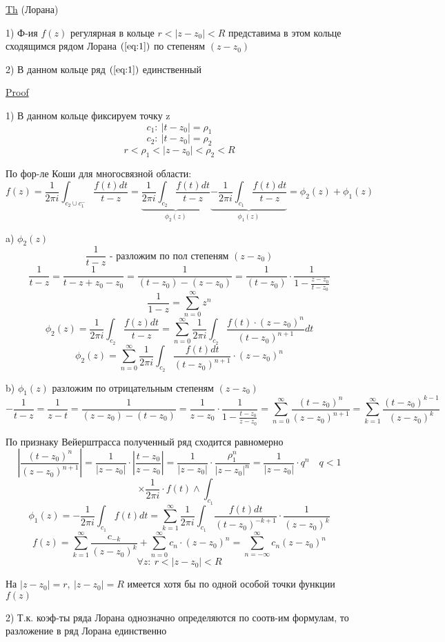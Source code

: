\documentclass[a4paper]{article}
\begin{document}
\begin{tcolorbox}
\underline{Th} (Лорана)

1) Ф-ия $ f(z) $ регулярная в кольце $ r < |z - z_0| < R $ представима в этом кольце
сходящимся рядом Лорана $ (\ref{eq:1}) $ по степеням $ (z - z_0) $ 

2) В данном кольце ряд $ (\ref{eq:1}) $ единственный

\underline{Proof}

1) В данном кольце фиксируем точку z
\[
    c_1: \ |t - z_0| = \rho_1
\]
\[
    c_2: \ |t - z_0| = \rho_2
\]
\[
    r < \rho_1 < |z - z_0| < \rho_2 < R
\]

По фор-ле Коши для многосвязной области:
\[
    f(z) = \frac{1}{2 \pi i} \int_{c_2 \cup c_1^{-}} \frac{f(t)dt}{t - z} = 
    \underbrace{\frac{1}{2 \pi i} \int_{c_2}\frac{f(t)dt}{t - z}}_{\phi_2(z)}
    \underbrace{- \frac{1}{2 \pi i} \int_{c_1}\frac{f(t)dt}{t - z}}_{\phi_1(z)}
    = \phi_2(z) + \phi_1(z)
\]

a) $ \phi_2(z) $ 
\[
    \frac{1}{t - z} \text{ - разложим по пол степеням }(z - z_0)
\]
\[
    \frac{1}{t - z} = \frac{1}{t - z + z_0 - z_0} = 
    \frac{1}{(t - z_0) - (z - z_0)} = \frac{1}{(t - z_0)} \cdot 
    \frac{1}{1 - \frac{z - z_0}{t - z_0}} 
\]
\[
    \frac{1}{1 - z} = \sum_{n=0}^{\infty} z^{n}
\]
\[
    \phi_2(z) = \frac{1}{2 \pi i} \int_{c_2} \frac{f(z)dt}{t - z} =
    \sum_{n=0}^{\infty} \frac{1}{2 \pi i} \int_{c_2}\frac{f(t)\cdot(z -z_0)^{n}}
    {(t-z_0)^{n+1}} dt
\]
\[
    \phi_2(z) = \sum_{n=0}^{\infty} \frac{1}{2 \pi i} \int_{c_2} \frac{f(t)dt}{(t - z_0)^{n+1}} 
    \cdot (z - z_0)^{n}
\]

b) $ \phi_1(z) $ разложим по отрицательным степеням $ (z - z_0) $ 
\[
    -\frac{1}{t-z} = \frac{1}{z-t} = \frac{1}{(z - z_0)-(t-z_0)} =
    \frac{1}{z - z_0} \cdot \frac{1}{1 - \frac{t-z_0}{z-z_0}} =
    \sum_{n=0}^{\infty} \frac{(t-z_0)^{n}}{(z-z_0)^{n+1}} = 
    \sum_{k=1}^{\infty} \frac{(t-z_0)^{k-1}}{(z-z_0)^{k}} 
\]

По признаку Вейерштрасса полученный ряд сходится равномерно
\[
    \left| \frac{(t-z_0)^{n}}{(z-z_0)^{n+1}} \right|  =\frac{1}{|z-z_0|} \cdot
    \left| \frac{t - z_0}{z - z_0} \right| = \frac{1}{|z - z_0|} \cdot
    \frac{\rho_1^{n}}{|z-z_0|^{n}} = \frac{1}{|z-z_0|} \cdot q^{n} \quad q < 1
\]
\[
    \times \frac{1}{2 \pi i} \cdot f(t) \land \int_{c_1}
\]
\[
    \phi_1(z) = -\frac{1}{2 \pi i} \int_{c_1}f(t)dt = \sum_{k=1}^{\infty} 
    \frac{1}{2 \pi i} \int_{c_1} \frac{f(t)dt}{(t-z_0)^{-k+1}} \cdot \frac{1}
    {(z - z_0)^{k}}  
\]
\[
    f(z) = \sum_{k=1}^{\infty} \frac{c_{-k}}{(z-z_0)^{k}} + \sum_{n=0}^{\infty} 
    c_n \cdot (z - z_0)^{n} = \sum_{n=-\infty}^{\infty} c_n (z - z_0)^{n}
\]
\[
    \forall z: \ r < |z-z_0| < R
\]

На $ |z-z_0| = r, \ |z-z_0| = R $ имеется хотя бы по одной особой точки функции
$ f(z) $ 

2) Т.к. коэф-ты ряда Лорана однозначно определяются по соотв-им формулам, то
разложение в ряд Лорана единственно
\end{tcolorbox}
\end{document}
